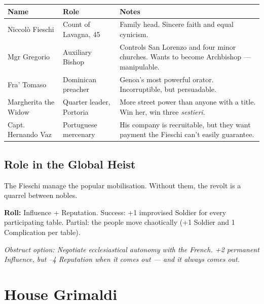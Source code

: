 \begin{center}
\begin{tabularx}{\textwidth}{L{2.8cm} L{2.8cm} X}
  \toprule
  \textbf{Name} & \textbf{Role} & \textbf{Notes} \\
  \midrule
  Niccolò Fieschi  & Count of Lavagna, 45  & Family head. Sincere faith and equal cynicism. \\
  Mgr Gregorio     & Auxiliary Bishop       & Controls San Lorenzo and four minor churches. Wants to become Archbishop --- manipulable. \\
  Fra' Tomaso      & Dominican preacher     & Genoa's most powerful orator. Incorruptible, but persuadable. \\
  Margherita the Widow & Quarter leader, Portoria & More street power than anyone with a title. Win her, win three \textit{sestieri}. \\
  Capt. Hernando Vaz & Portuguese mercenary & His company is recruitable, but they want payment the Fieschi can't easily guarantee. \\
  \bottomrule
\end{tabularx}
\end{center}

\section{Role in the Global Heist}

The Fieschi manage the popular mobilisation. Without them, the revolt
is a quarrel between nobles.

\textbf{Roll:} Influence + Reputation. Success: +1 improvised Soldier for
every participating table. Partial: the people move chaotically
(+1 Soldier and 1 Complication per table).

\textit{Obstruct option: Negotiate ecclesiastical autonomy with the French.
+2 permanent Influence, but --4 Reputation when it comes out --- and it
always comes out.}

\chapter{House Grimaldi}
\label{ch:grimaldi}


